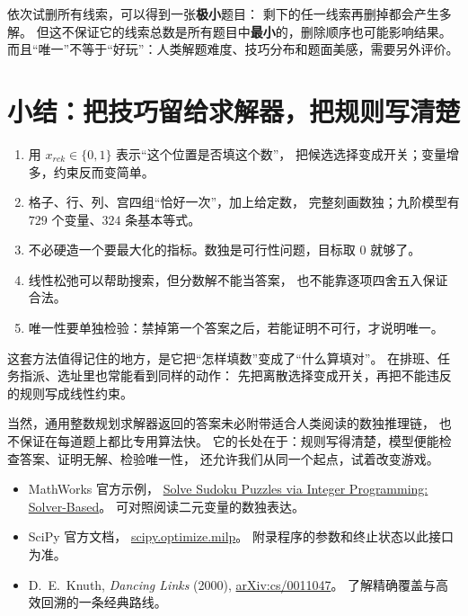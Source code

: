 \documentclass[UTF8,11pt,fontset=none]{ctexart}
\begin{document}
\begin{warnbox}
依次试删所有线索，可以得到一张\textbf{极小}题目：
剩下的任一线索再删掉都会产生多解。
但这不保证它的线索总数是所有题目中\textbf{最小}的，删除顺序也可能影响结果。
而且“唯一”不等于“好玩”：人类解题难度、技巧分布和题面美感，需要另外评价。
\end{warnbox}

\section{小结：把技巧留给求解器，把规则写清楚}
\begin{enumerate}
 \item 用 $x_{rck}\in\{0,1\}$ 表示“这个位置是否填这个数”，
 把候选选择变成开关；变量增多，约束反而变简单。
 \item 格子、行、列、宫四组“恰好一次”，加上给定数，
 完整刻画数独；九阶模型有 $729$ 个变量、$324$ 条基本等式。
 \item 不必硬造一个要最大化的指标。数独是可行性问题，目标取 $0$ 就够了。
 \item 线性松弛可以帮助搜索，但分数解不能当答案，
 也不能靠逐项四舍五入保证合法。
 \item 唯一性要单独检验：禁掉第一个答案之后，若能证明不可行，才说明唯一。
\end{enumerate}
这套方法值得记住的地方，是它把“怎样填数”变成了“什么算填对”。
在排班、任务指派、选址里也常能看到同样的动作：
先把离散选择变成开关，再把不能违反的规则写成线性约束。

当然，通用整数规划求解器返回的答案未必附带适合人类阅读的数独推理链，
也不保证在每道题上都比专用算法快。
它的长处在于：规则写得清楚，模型便能检查答案、证明无解、检验唯一性，
还允许我们从同一个起点，试着改变游戏。

\begin{keybox}[参考与继续阅读]
\begin{itemize}
 \item MathWorks 官方示例，
 \href{https://www.mathworks.com/help/optim/ug/solve-sudoku-puzzles-via-integer-programming-solver-based.html}{Solve Sudoku Puzzles via Integer Programming: Solver-Based}。
 可对照阅读二元变量的数独表达。
 \item SciPy 官方文档，
 \href{https://docs.scipy.org/doc/scipy/reference/generated/scipy.optimize.milp.html}{scipy.optimize.milp}。
 附录程序的参数和终止状态以此接口为准。
 \item D.~E.~Knuth, \textit{Dancing Links} (2000),
 \href{https://arxiv.org/abs/cs/0011047}{arXiv:cs/0011047}。
 了解精确覆盖与高效回溯的一条经典路线。
\end{itemize}
\end{keybox}
\end{document}
